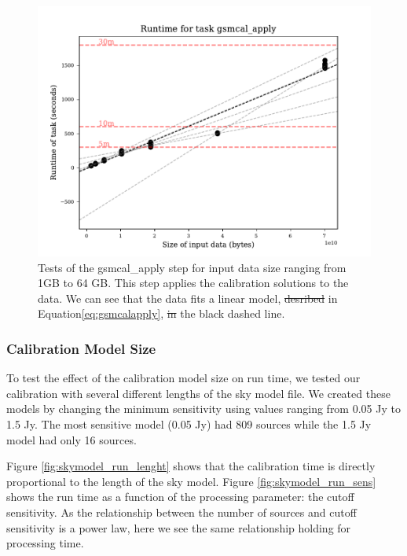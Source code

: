\documentclass[preprint,5p]{elsarticle}
\providecommand{\DIFadd}[1]{{\protect\color{blue}\uwave{#1}}} %
\providecommand{\DIFdel}[1]{{\protect\color{red}\sout{#1}}}                      %
\providecommand{\DIFaddFL}[1]{\DIFadd{#1}} %
\providecommand{\DIFdelFL}[1]{\DIFdel{#1}} %
\providecommand{\DIFaddbeginFL}{} %
\providecommand{\DIFaddendFL}{} %
\providecommand{\DIFdelbeginFL}{} %
\providecommand{\DIFdelendFL}{} %
\newcommand{\DIFscaledelfig}{0.5}
\newlength{\DIFdelgraphicswidth} %
\newlength{\DIFdelgraphicsheight} %
\newcommand{\DIFaddincludegraphics}[2][]{{\color{blue}\fbox{\DIFOincludegraphics[#1]{#2}}}} %
\newcommand{\DIFdelincludegraphics}[2][]{%
\sbox{\DIFdelgraphicsbox}{\DIFOincludegraphics[#1]{#2}}%
\settoboxwidth{\DIFdelgraphicswidth}{\DIFdelgraphicsbox} %
\settoboxtotalheight{\DIFdelgraphicsheight}{\DIFdelgraphicsbox} %
\scalebox{\DIFscaledelfig}{%
\parbox[b]{\DIFdelgraphicswidth}{\usebox{\DIFdelgraphicsbox}\\[-\baselineskip] \rule{\DIFdelgraphicswidth}{0em}}\llap{\resizebox{\DIFdelgraphicswidth}{\DIFdelgraphicsheight}{%
\setlength{\unitlength}{\DIFdelgraphicswidth}%
\begin{picture}(1,1)%
\thicklines\linethickness{2pt} %
{\color[rgb]{1,0,0}\put(0,0){\framebox(1,1){}}}%
{\color[rgb]{1,0,0}\put(0,0){\line( 1,1){1}}}%
{\color[rgb]{1,0,0}\put(0,1){\line(1,-1){1}}}%
\end{picture}%
}\hspace*{3pt}}} %
} %
\DeclareRobustCommand{\DIFaddbeginFL}{\DIFOaddbeginFL \let\includegraphics\DIFaddincludegraphics} %
\DeclareRobustCommand{\DIFaddendFL}{\DIFOaddendFL \let\includegraphics\DIFOincludegraphics} %
\DeclareRobustCommand{\DIFdelbeginFL}{\DIFOdelbeginFL \let\includegraphics\DIFdelincludegraphics} %
\DeclareRobustCommand{\DIFdelendFL}{\DIFOaddendFL \let\includegraphics\DIFOincludegraphics} %
\begin{document}
\begin{figure}
\includegraphics[width=0.95\linewidth]{figures/gsmcal_apply_size.pdf}
        \caption{\DIFaddbeginFL \small \DIFaddendFL Tests of the \DIFaddbeginFL {\selectfont \DIFaddendFL gsmcal\_apply\DIFaddbeginFL } \DIFaddendFL step for input data size ranging from 1GB to 64 GB. This step applies the calibration solutions to the data. We can see that the data fits a linear model, \DIFdelbeginFL \DIFdelFL{desribed }\DIFdelendFL \DIFaddbeginFL \DIFaddFL{described }\DIFaddendFL in Equation\ref{eq:gsmcalapply}, \DIFdelbeginFL \DIFdelFL{in }\DIFdelendFL \DIFaddbeginFL \DIFaddFL{as }\DIFaddendFL the black dashed line.}
            \label{fig:gsmcalapply_size}
\end{figure}

\subsubsection{Calibration Model Size}
To test the effect of the calibration model size on run time, we tested our calibration with several different lengths of the sky model file. We created these models by changing the minimum sensitivity using values ranging from 0.05 Jy to 1.5 Jy. The most sensitive model (0.05 Jy) had 809 sources while the 1.5 Jy model had only 16 sources. 

Figure \ref{fig:skymodel_run_lenght} shows that the calibration time is directly proportional to the length of the sky model. Figure \ref{fig:skymodel_run_sens} shows the run time as a function of the processing parameter: the cutoff sensitivity. As the relationship between the number of sources and cutoff sensitivity is a power law, here we see the same relationship holding for processing time.
\end{document}
